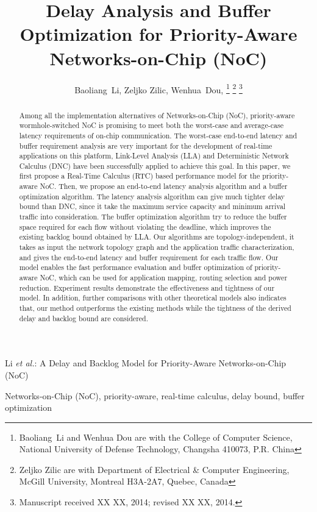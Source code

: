 \documentclass[10pt,journal]{IEEEtran}
\begin{document}
\title{Delay Analysis and Buffer Optimization for Priority-Aware Networks-on-Chip (NoC)}

\author{Baoliang~Li, %
        Zeljko Zilic, %
        Wenhua~Dou, %
\thanks{Baoliang~Li and Wenhua Dou are with the College of Computer Science, National University of Defense Technology, Changsha 410073, P.R. China}%
\thanks{Zeljko Zilic are with Department of Electrical \& Computer Engineering, McGill University, Montreal H3A-2A7, Quebec, Canada}%
\thanks{Manuscript received XX XX, 2014; revised XX XX, 2014.}}

%
{Li \MakeLowercase{\textit{et al.}}: A Delay and Backlog Model for Priority-Aware Networks-on-Chip (NoC)}

\maketitle

\begin{abstract}
Among all the implementation alternatives of Networks-on-Chip (NoC), priority-aware wormhole-switched NoC is promising to meet both the worst-case and average-case latency requirements of on-chip communication. The worst-case end-to-end latency and buffer requirement analysis are very important for the development of real-time applications on this platform, Link-Level Analysis (LLA) and Deterministic Network Calculus (DNC) have been successfully applied to achieve this goal. In this paper, we first propose a Real-Time Calculus (RTC) based performance model for the priority-aware NoC. Then, we propose an end-to-end latency analysis algorithm and a buffer optimization algorithm. The latency analysis algorithm can give much tighter delay bound than DNC, since it take the maximum service capacity and minimum arrival traffic into consideration. The buffer optimization algorithm try to reduce the buffer space required for each flow without violating the deadline, which improves the existing backlog bound obtained by LLA. Our algorithms are topology-independent, it takes as input the network topology graph and the application traffic characterization, and gives the end-to-end latency and buffer requirement for each traffic flow. Our model enables the fast performance evaluation and buffer optimization of priority-aware NoC, which can be used for application mapping, routing selection and power reduction. Experiment results demonstrate the effectiveness and tightness of our model. In addition, further comparisons with other theoretical models also indicates that, our method outperforms the existing methods while the tightness of the derived delay and backlog bound are considered.
\end{abstract}
\begin{IEEEkeywords}
Networks-on-Chip (NoC), priority-aware, real-time calculus, delay bound, buffer optimization
\end{IEEEkeywords}
\end{document}
